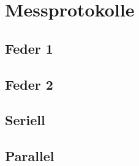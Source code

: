 \documentclass[../main.tex]{subfiles} %
\begin{document}
\chapter{Messprotokolle}\label{ch:messprotokolle}

    \section{Feder 1}\label{sec:feder-1}

    \section{Feder 2}\label{sec:feder-2}

    \section{Seriell}\label{sec:seriell}

    \section{Parallel}\label{sec:parallel}
\end{document}
